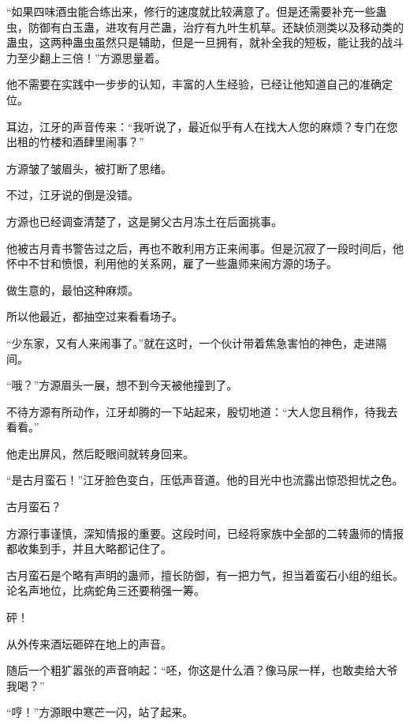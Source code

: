 \begin{this_body}
“如果四味酒虫能合练出来，修行的速度就比较满意了。但是还需要补充一些蛊虫，防御有白玉蛊，进攻有月芒蛊，治疗有九叶生机草。还缺侦测类以及移动类的蛊虫，这两种蛊虫虽然只是辅助，但是一旦拥有，就补全我的短板，能让我的战斗力至少翻上三倍！”方源思量着。

他不需要在实践中一步步的认知，丰富的人生经验，已经让他知道自己的准确定位。

耳边，江牙的声音传来：“我听说了，最近似乎有人在找大人您的麻烦？专门在您出租的竹楼和酒肆里闹事？”

方源皱了皱眉头，被打断了思绪。

不过，江牙说的倒是没错。

方源也已经调查清楚了，这是舅父古月冻土在后面挑事。

他被古月青书警告过之后，再也不敢利用方正来闹事。但是沉寂了一段时间后，他怀中不甘和愤恨，利用他的关系网，雇了一些蛊师来闹方源的场子。

做生意的，最怕这种麻烦。

所以他最近，都抽空过来看看场子。

“少东家，又有人来闹事了。”就在这时，一个伙计带着焦急害怕的神色，走进隔间。

“哦？”方源眉头一展，想不到今天被他撞到了。

不待方源有所动作，江牙却腾的一下站起来，殷切地道：“大人您且稍作，待我去看看。”

他走出屏风，然后眨眼间就转身回来。

“是古月蛮石！”江牙脸色变白，压低声音道。他的目光中也流露出惊恐担忧之色。

古月蛮石？

方源行事谨慎，深知情报的重要。这段时间，已经将家族中全部的二转蛊师的情报都收集到手，并且大略都记住了。

古月蛮石是个略有声明的蛊师，擅长防御，有一把力气，担当着蛮石小组的组长。论名声地位，比病蛇角三还要稍强一筹。

砰！

从外传来酒坛砸碎在地上的声音。

随后一个粗犷嚣张的声音响起：“呸，你这是什么酒？像马尿一样，也敢卖给大爷我喝？”

“哼！”方源眼中寒芒一闪，站了起来。

\end{this_body}

